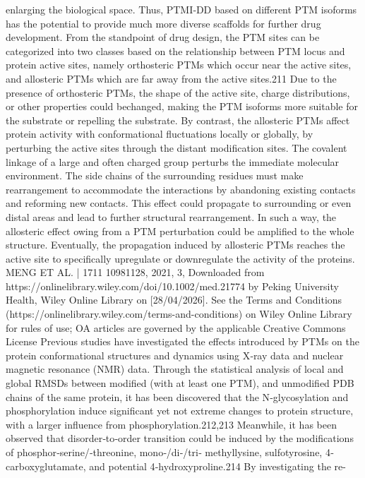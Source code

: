 enlarging the biological space. Thus, PTMI‐DD based on different PTM isoforms has the potential to provide much
more diverse scaffolds for further drug development.
From the standpoint of drug design, the PTM sites can be categorized into two classes based on the
relationship between PTM locus and protein active sites, namely orthosteric PTMs which occur near the
active sites, and allosteric PTMs which are far away from the active sites.211 Due to the presence of
orthosteric PTMs, the shape of the active site, charge distributions, or other properties could bechanged,
making the PTM isoforms more suitable for the substrate or repelling the substrate. By contrast, the
allosteric PTMs affect protein activity with conformational fluctuations locally or globally, by perturbing the
active sites through the distant modification sites. The covalent linkage of a large and often charged group
perturbs the immediate molecular environment. The side chains of the surrounding residues must make
rearrangement to accommodate the interactions by abandoning existing contacts and reforming new
contacts. This effect could propagate to surrounding or even distal areas and lead to further structural
rearrangement. In such a way, the allosteric effect owing from a PTM perturbation could be amplified to the
whole structure. Eventually, the propagation induced by allosteric PTMs reaches the active site to
specifically upregulate or downregulate the activity of the proteins.
MENG ET AL.
| 1711
 10981128, 2021, 3, Downloaded from https://onlinelibrary.wiley.com/doi/10.1002/med.21774 by Peking University Health, Wiley Online Library on [28/04/2026]. See the Terms and Conditions (https://onlinelibrary.wiley.com/terms-and-conditions) on Wiley Online Library for rules of use; OA articles are governed by the applicable Creative Commons License
Previous studies have investigated the effects introduced by PTMs on the protein conformational structures
and dynamics using X‐ray data and nuclear magnetic resonance (NMR) data. Through the statistical analysis of local
and global RMSDs between modified (with at least one PTM), and unmodified PDB chains of the same protein, it
has been discovered that the N‐glycosylation and phosphorylation induce significant yet not extreme changes to
protein structure, with a larger influence from phosphorylation.212,213 Meanwhile, it has been observed that
disorder‐to‐order transition could be induced by the modifications of phosphor‐serine/‐threonine, mono‐/di‐/tri‐
methyllysine, sulfotyrosine, 4‐carboxyglutamate, and potential 4‐hydroxyproline.214 By investigating the re-
